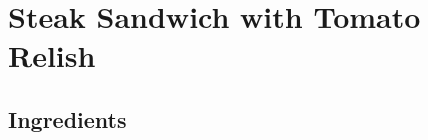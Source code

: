\thispagestyle{fancy}
\section{Steak Sandwich with Tomato Relish}
\AddToShipoutPicture*{\SteakSandwhich}

\subsection*{Ingredients}